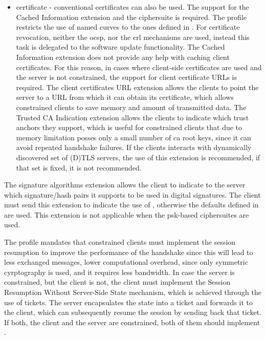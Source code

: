 \documentclass{llncs}
\begin{document}
\begin{itemize}
  \item certificate - conventional certificates can also be used. The support
  for the Cached Information extension\cite{RFC7924} and the 
  ciphersuite is required. The profile restricts the use of named curves to
  the ones defined in \cite{RFC4492}. For certificate revocation, neither the
  \gls{ocsp}\cite{RFC6960}, nor the \gls{crl}\cite{RFCabc} mechanisms are used, instead this task is delegated to
  the software update functionality. The Cached Information extension does not
  provide any help with caching client certificates. For this reason, in cases
  where client-side certificates are used and the server is not constrained,
  the support for client certificate URLs is required. The client certificates URL
  extension\cite{RFC4366} allows the clients to point the server to a URL from
  which it can obtain its certificate, which allows constrained clients to
  save memory and amount of transmitted data. The Trusted CA Indication\cite{RFC6066}
  extension allows the clients to indicate which trust anchors they support, which is useful
  for constrained clients that due to memory limitation posses only a small number
  of \gls{ca} root keys, since it can avoid repeated handshake failures. If the clients interacts with
  dynamically discovered set of (D)TLS servers, the use of this extension is recommended,
  if that set is fixed, it is not recommended.

\end{itemize}

The signature algorithms extension\cite{RFC5246} allows the client to indicate
to the server which signature/hash pairs it supports to be used in digital signatures.
The client must send this extension to indicate the use of ,
otherwise the defaults defined in \cite{RFC5246} are used. This extension is not
applicable when the \gls{psk}-based ciphersuites are used.

The profile mandates that constrained clients must implement the session
resumption to improve the performance of the handshake since this will lead to
less exchanged messages, lower computational overhead, since only symmetric cyrptography
is used, and it requires less bandwidth. In case the server is constrained, but
the client is not, the client must implement the Session Resumption Without
Server-Side State mechanism\cite{RFC5077}, which is achieved through the
use of tickets. The server encapsulates the state into a ticket and forwards it to
the client, which can subsequently resume the session by sending back that ticket.
If both, the client and the server are constrained, both of them should implement
\cite{RFC5077}.
\end{document}
